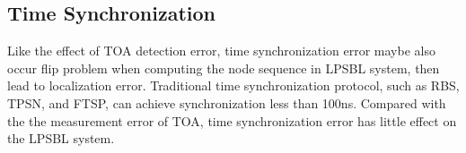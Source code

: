 \subsection{Time Synchronization }

Like the effect of TOA detection error, time synchronization error maybe also occur flip problem when computing the node sequence in LPSBL system, then lead to localization error.
Traditional time synchronization protocol, such as RBS, TPSN, and FTSP, can achieve synchronization less than 100ns. 
Compared with the the measurement error of TOA, time synchronization error has little effect on the LPSBL system.





